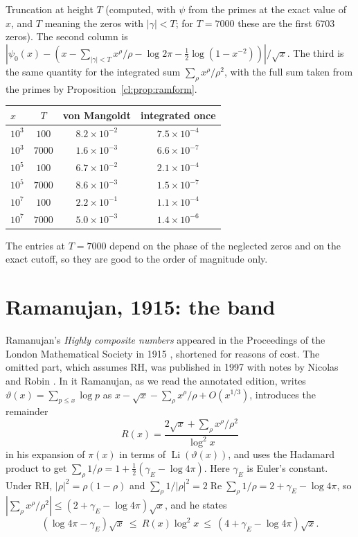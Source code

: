 \begin{computation}\label{cl:comp:vm}
Truncation at height $T$ (computed, with $\psi$ from the primes at the exact value of $x$, and $T$ meaning the zeros with $|\gamma|<T$; for $T=7000$ these are the first $6703$ zeros). The second column is $|\psi_0(x)-(x-\sum_{|\gamma|<T}x^\rho/\rho-\log2\pi-\frac12\log(1-x^{-2}))|/\sqrt x$. The third is the same quantity for the integrated sum $\sum_\rho x^\rho/\rho^2$, with the full sum taken from the primes by Proposition~\ref{cl:prop:ramform}.
\begin{center}\small
\begin{tabular}{@{}lccc@{}}
\toprule
$x$ & $T$ & von Mangoldt & integrated once\\
\midrule
$10^3$ & $100$ & $8.2\times10^{-2}$ & $7.5\times10^{-4}$\\
$10^3$ & $7000$ & $1.6\times10^{-3}$ & $6.6\times10^{-7}$\\
$10^5$ & $100$ & $6.7\times10^{-2}$ & $2.1\times10^{-4}$\\
$10^5$ & $7000$ & $8.6\times10^{-3}$ & $1.5\times10^{-7}$\\
$10^7$ & $100$ & $2.2\times10^{-1}$ & $1.1\times10^{-4}$\\
$10^7$ & $7000$ & $5.0\times10^{-3}$ & $1.4\times10^{-6}$\\
\bottomrule
\end{tabular}
\end{center}
The entries at $T=7000$ depend on the phase of the neglected zeros and on the exact cutoff, so they are good to the order of magnitude only.
\end{computation}

\section{Ramanujan, 1915: the band}\label{cl:sec:ramanujan}

Ramanujan's \emph{Highly composite numbers} appeared in the Proceedings of the London Mathematical Society in 1915 \cite{Ramanujan15}, shortened for reasons of cost. The omitted part, which assumes RH, was published in 1997 with notes by Nicolas and Robin \cite{Ramanujan97}. %
In it Ramanujan, as we read the annotated edition, writes $\vartheta(x)=\sum_{p\le x}\log p$ as $x-\sqrt x-\sum_\rho x^\rho/\rho+O(x^{1/3})$, introduces the remainder
\[
R(x)=\frac{2\sqrt x+\sum_\rho x^\rho/\rho^2}{\log^2x}
\]
in his expansion of $\pi(x)$ in terms of $\operatorname{Li}(\vartheta(x))$, and uses the Hadamard product to get $\sum_\rho1/\rho=1+\frac12(\gamma_E-\log4\pi)$. Here $\gamma_E$ is Euler's constant. Under RH, $|\rho|^2=\rho(1-\rho)$ and $\sum_\rho1/|\rho|^2=2\operatorname{Re}\sum_\rho1/\rho=2+\gamma_E-\log4\pi$, so $|\sum_\rho x^\rho/\rho^2|\le(2+\gamma_E-\log4\pi)\sqrt x$, and he states
\[
(\log4\pi-\gamma_E)\sqrt x\ \le\ R(x)\log^2x\ \le\ (4+\gamma_E-\log4\pi)\sqrt x .
\]

